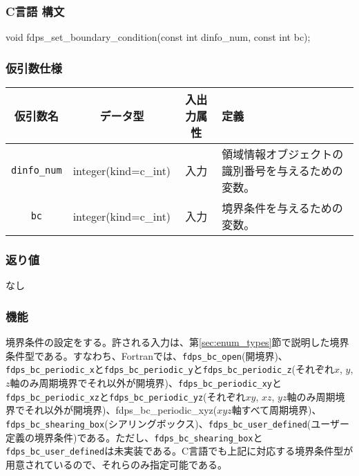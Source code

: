 \subsubsection*{C言語 構文}
\begin{screen}
\begin{spverbatim}
void fdps_set_boundary_condition(const int dinfo_num,
                                 const int bc);
\end{spverbatim}
\end{screen}

\subsubsection*{仮引数仕様}
\begin{table}[h]
\begin{tabularx}{\linewidth}{cccX}
\toprule
\rowcolor{Snow2}
仮引数名 & データ型 & 入出力属性 & 定義 \\
\midrule
\texttt{dinfo\_num} & integer(kind=c\_int) & 入力 & 領域情報オブジェクトの識別番号を与えるための変数。\\
\texttt{bc} & integer(kind=c\_int) & 入力 & 境界条件を与えるための変数。\\
\bottomrule
\end{tabularx}
\end{table}

\subsubsection*{返り値}
なし

\subsubsection*{機能}
境界条件の設定をする。許される入力は、第\ref{sec:enum_types}節で説明した境界条件型である。すなわち、Fortranでは、\texttt{fdps\_bc\_open}(開境界)、\texttt{fdps\_bc\_periodic\_x}と\texttt{fdps\_bc\_periodic\_y}と\texttt{fdps\_bc\_periodic\_z}(それぞれ$x$, $y$, $z$軸のみ周期境界でそれ以外が開境界)、\texttt{fdps\_bc\_periodic\_xy}と\texttt{fdps\_bc\_periodic\_xz}と\texttt{fdps\_bc\_periodic\_yz}(それぞれ$xy$, $xz$, $yz$軸のみ周期境界でそれ以外が開境界)、fdps\_bc\_periodic\_xyz($xyz$軸すべて周期境界)、\texttt{fdps\_bc\_shearing\_box}(シアリングボックス)、\texttt{fdps\_bc\_user\_defined}(ユーザー定義の境界条件)である。ただし、\texttt{fdps\_bc\_shearing\_box}と\texttt{fdps\_bc\_user\_defined}は未実装である。C言語でも上記に対応する境界条件型が用意されているので、それらのみ指定可能である。

